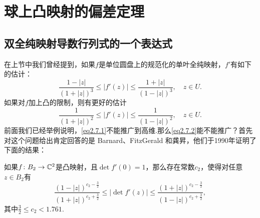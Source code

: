 \section{球上凸映射的偏差定理\label{sec2.7}}
\subsection{双全纯映射导数行列式的一个表达式}
在上节中我们曾经提到，如果$f$是单位圆盘上的规范化的单叶全纯映射，$f'$有如下的估计：
\begin{equation}\label{eq2.7.1}
	\frac{1-|z|}{(1+|z|)^3}\le|f'(z)|\le\frac{1+|z|}{(1-|z|)^3},\quad z\in U.
\end{equation}
如果对$f$加上凸的限制，则有更好的估计
\begin{equation}\label{eq2.7.2}
	\frac1{(1+|z|)^2}\le|f'(z)|\le\frac1{(1-|z|)^2},\quad z\in U.
\end{equation}
前面我们已经举例说明，\eqref{eq2.7.1}不能推广到高维.那么\eqref{eq2.7.2}能不能推广？首先对这个问题给出肯定回答的是 Barnard、FitzGerald 和龚{昇}\cite{barnard1994distortion}，他们于1990年证明了下面的结果：

如果$f\colon B_2\to \mathbb C^2$是凸映射，且$\det f'(0)=1$，那么存在常数$c_2$，使得对任意$z\in B_2$有
\[\frac{(1-|z|)^{c_2-\frac32}}{(1+|z|)^{c_2+\frac32}}\le|\det f'(z)|\le\frac{(1+|z|)^{c_2-\frac32}}{(1-|z|)^{c_2+\frac32}},\]
其中$\frac32\le c_2<1.761$.

